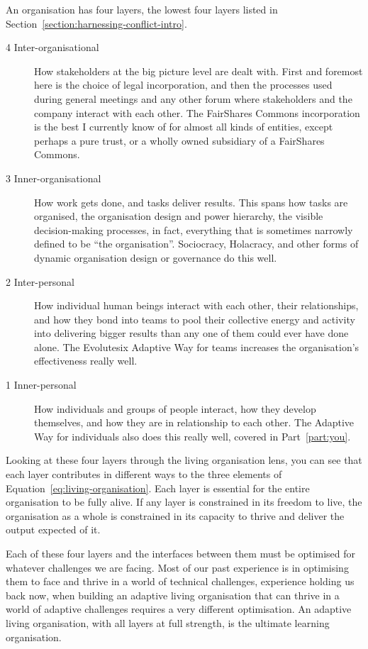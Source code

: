 An organisation has four layers,  the lowest four layers listed in Section~\ref{section:harnessing-conflict-intro}.
\begin{description}
\item[4 Inter-organisational] How stakeholders at the big picture level are dealt with. First and foremost here is the choice of legal incorporation, and then the processes used during general meetings and any other forum where stakeholders and the company interact with each other. The FairShares Commons incorporation is the best I currently know of for almost all kinds of entities, except perhaps a pure trust, or a wholly owned subsidiary of a FairShares Commons. 
\item[3 Inner-organisational] How work gets done, and tasks deliver results. This spans how tasks are organised, the organisation design and power hierarchy, the visible decision-making processes, in fact, everything that is sometimes narrowly defined to be “the organisation”. Sociocracy, Holacracy,  and other forms of dynamic organisation design or governance do this well.  
\item[2 Inter-personal] How individual human beings interact with each other, their relationships, and how they bond into teams to pool their collective energy and activity into delivering bigger results than any one of them could ever have done alone. The Evolutesix Adaptive Way  for teams increases the organisation’s effectiveness really well.
\item[1 Inner-personal] How individuals and groups of people interact, how they develop themselves, and how they are in relationship to each other. The Adaptive Way for individuals also does this really well, covered in Part~\ref{part:you}.
\end{description}




Looking at these four layers through the living organisation lens, you can see that each layer contributes in different ways to the three elements of Equation~\ref{eq:living-organisation}. Each layer is essential for the entire organisation to be fully alive. If any layer is constrained in its freedom to live, the organisation as a whole is constrained in its capacity to thrive and deliver the output expected of it.


Each of these four layers and the interfaces between them must be optimised for whatever challenges we are facing. Most of our past experience is in optimising them to face and thrive in a world of technical challenges, experience holding us back now, when building an adaptive living organisation that can thrive in a world of adaptive challenges requires a very different optimisation. An adaptive living organisation, with all layers at full strength, is the ultimate learning organisation\cite{senge-fifth}.


